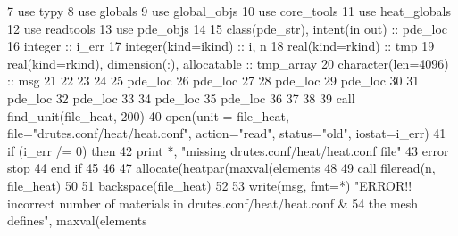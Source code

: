 \begin{DoxyCode}
7       \textcolor{keywordtype}{use }typy
8       \textcolor{keywordtype}{use }globals
9       \textcolor{keywordtype}{use }global_objs
10       \textcolor{keywordtype}{use }core_tools
11       \textcolor{keywordtype}{use }heat_globals
12       \textcolor{keywordtype}{use }readtools
13       \textcolor{keywordtype}{use }pde_objs
14 
15       \textcolor{keywordtype}{class}(pde_str), \textcolor{keywordtype}{intent(in out)} :: pde\_loc
16       \textcolor{keywordtype}{integer} :: i\_err
17       \textcolor{keywordtype}{integer(kind=ikind)} :: i, n
18       \textcolor{keywordtype}{real(kind=rkind)} :: tmp
19       \textcolor{keywordtype}{real(kind=rkind)}, \textcolor{keywordtype}{dimension(:)}, \textcolor{keywordtype}{allocatable} :: tmp\_array
20       \textcolor{keywordtype}{character(len=4096)} :: msg
21 
22       
23       
24 
25       pde\_loc%
26       pde\_loc%
27 
28       pde\_loc%
29       pde\_loc%
30 
31       pde\_loc%
32       pde\_loc%
33 
34       pde\_loc%
35       pde\_loc%
36       
37       
38 
39       \textcolor{keyword}{call }find_unit(file_heat, 200)
40       \textcolor{keyword}{open}(unit = file_heat, file=\textcolor{stringliteral}{"drutes.conf/heat/heat.conf"}, action=\textcolor{stringliteral}{"read"}\textcolor{comment}{, status=}\textcolor{stringliteral}{"old"}\textcolor{comment}{, iostat=i\_err)}
41 \textcolor{comment}{      }\textcolor{keywordflow}{if} (i\_err /= 0) \textcolor{keywordflow}{then}
42         print *, \textcolor{stringliteral}{"missing drutes.conf/heat/heat.conf file"}
43         error stop
44 \textcolor{keywordflow}{      end if}
45      
46 
47       \textcolor{keyword}{allocate}(heatpar(maxval(elements%
48       
49       \textcolor{keyword}{call }fileread(n, file_heat)
50       
51       backspace(file_heat)
52       
53       \textcolor{keyword}{write}(msg, fmt=*) \textcolor{stringliteral}{"ERROR!! incorrect number of materials in drutes.conf/heat/heat.conf  &}
54 \textcolor{stringliteral}{}\textcolor{stringliteral}{        the mesh defines"}, maxval(elements%

\end{DoxyCode}
